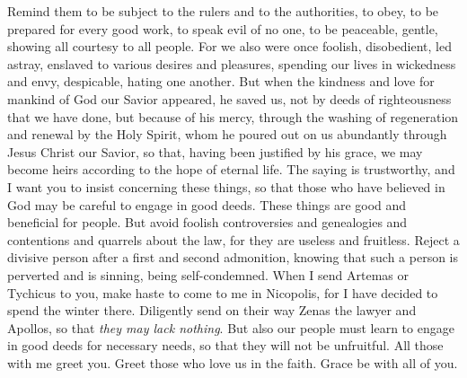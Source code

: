 \begin{biblechapter} %
 Remind them to be subject to the rulers and to the authorities, to obey, to be prepared for every good work,
\verse to speak evil of no one, to be peaceable, gentle, showing all courtesy to all people.
\verse For we also were once foolish, disobedient, led astray, enslaved to various desires and pleasures, spending our lives in wickedness and envy, despicable, hating one another.
\verse But when the kindness and love for mankind of God our Savior appeared,
\verse he saved us, not by deeds of righteousness that we have done, but because of his mercy, through the washing of regeneration and renewal by the Holy Spirit,
\verse whom he poured out on us abundantly through Jesus Christ our Savior,
\verse so that, having been justified by his grace, we may become heirs according to the hope of eternal life.
 The saying is trustworthy, and I want you to insist concerning these things, so that those who have believed in God may be careful to engage in good deeds. These things are good and beneficial for people.
\verse But avoid foolish controversies and genealogies and contentions and quarrels about the law, for they are useless and fruitless.
\verse Reject a divisive person after a first and second admonition,
\verse knowing that such a person is perverted and is sinning, being self-condemned.
\verse When I send Artemas or Tychicus to you, make haste to come to me in Nicopolis, for I have decided to spend the winter there.
\verse Diligently send on their way Zenas the lawyer and Apollos, so that \textit{they may lack nothing}.
\verse But also our people must learn to engage in good deeds for necessary needs, so that they will not be unfruitful.
\verse All those with me greet you. Greet those who love us in the faith. Grace be with all of you.
\end{biblechapter}

